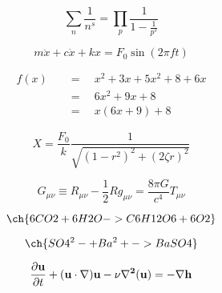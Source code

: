 \begin{equation}
    \sum_n \frac{1}{n^s} = \prod_p \frac{1}{1 - \frac{1}{p^s}}
\end{equation}

\begin{equation}
    m \ddot{x} + c \dot{x} + k x = F_0 \sin \left( 2 \pi f t \right)
\end{equation}

\begin{align}
    f(x) \quad & = \quad x^2 + 3x + 5x^2 + 8 + 6x \\
         \quad & = \quad 6x^2 + 9x + 8 \\
         \quad & = \quad x(6 x + 9) + 8
\end{align}

\begin{equation}
    X = \frac{F_0}{k} \frac{1}{\sqrt{(1 - r^2)^2 + (2 \zeta r)^2}}
\end{equation}

\begin{equation}
    G_{\mu\nu} \equiv R_{\mu\nu} - \frac{1}{2} R g_{\mu\nu} = \frac{8 \pi G}{c^4} T_{\mu\nu}
\end{equation}

\begin{equation}
    \ch{6 CO2 + 6 H2O -> C6H12O6 + 6 O2} %
\end{equation}

\begin{equation}
    \ch{SO4^2- + Ba^2+ -> BaSO4} %
\end{equation}

\begin{equation}
    \frac{\partial{\bf{u}}}{\partial{t}}+(\bf{u}\cdot\nabla)\bf{u}-\nu\nabla^2\bf(u)=-\nabla h
\end{equation}
